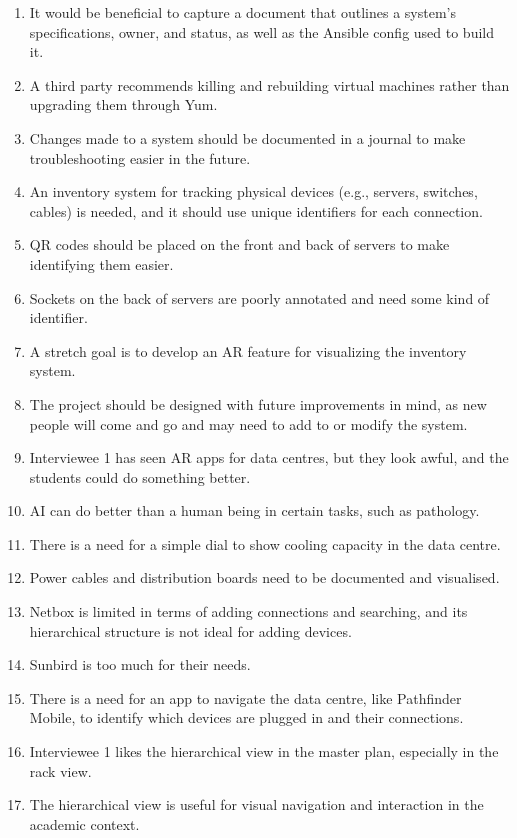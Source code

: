\begin{enumerate}
    \item It would be beneficial to capture a document that outlines a system's specifications, owner, and status, as well as the Ansible config used to build it.
    \item A third party recommends killing and rebuilding virtual machines rather than upgrading them through Yum.
    \item Changes made to a system should be documented in a journal to make troubleshooting easier in the future.
    \item An inventory system for tracking physical devices (e.g., servers, switches, cables) is needed, and it should use unique identifiers for each connection.
    \item QR codes should be placed on the front and back of servers to make identifying them easier.
    \item Sockets on the back of servers are poorly annotated and need some kind of identifier.
    \item A stretch goal is to develop an AR feature for visualizing the inventory system.
    \item The project should be designed with future improvements in mind, as new people will come and go and may need to add to or modify the system.
    \item Interviewee 1 has seen AR apps for data centres, but they look awful, and the students could do something better.
    \item AI can do better than a human being in certain tasks, such as pathology.
    \item There is a need for a simple dial to show cooling capacity in the data centre.
    \item Power cables and distribution boards need to be documented and visualised.
    \item Netbox is limited in terms of adding connections and searching, and its hierarchical structure is not ideal for adding devices.
    \item Sunbird is too much for their needs.
    \item There is a need for an app to navigate the data centre, like Pathfinder Mobile, to identify which devices are plugged in and their connections.
    \item Interviewee 1 likes the hierarchical view in the master plan, especially in the rack view.
    \item The hierarchical view is useful for visual navigation and interaction in the academic context.

\end{enumerate}
